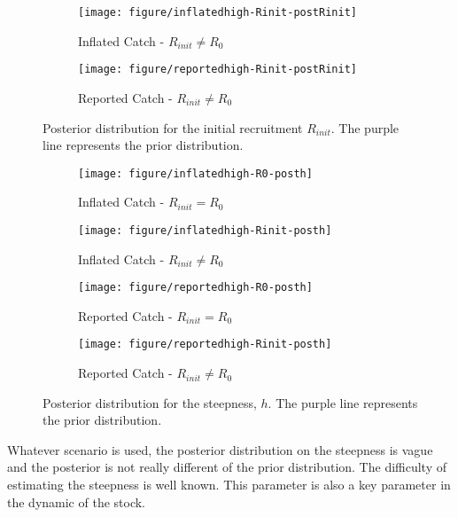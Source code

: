  \begin{figure}[htbp]
 \begin{subfigure}[b]{0.45\textwidth} 
 \texttt{[image: figure/inflatedhigh-Rinit-postRinit]}
  \caption{Inflated Catch - $R_{init}\ne R_0$}
  \end{subfigure} \hfill
 \begin{subfigure}[b]{0.45\textwidth} 
 \texttt{[image: figure/reportedhigh-Rinit-postRinit]}
  \caption{Reported Catch - $R_{init}\ne R_0$}
  \end{subfigure}
  \caption{Posterior distribution for the initial recruitment $R_{init}$. The purple line represents the prior distribution.}
  \label{fig:postRinit}
 \end{figure}
 
 
 
 
 \begin{figure}[htbp]
 \begin{subfigure}[b]{0.45\textwidth}
 \texttt{[image: figure/inflatedhigh-R0-posth]}
  \caption{Inflated Catch - $R_{init}=R_0$}
  \end{subfigure} \hfill
 \begin{subfigure}[b]{0.45\textwidth} 
 \texttt{[image: figure/inflatedhigh-Rinit-posth]}
  \caption{Inflated Catch - $R_{init}\ne R_0$}
  \end{subfigure}
 \begin{subfigure}[b]{0.45\textwidth}
 \texttt{[image: figure/reportedhigh-R0-posth]}
  \caption{Reported Catch - $R_{init}=R_0$}
  \end{subfigure} \hfill
 \begin{subfigure}[b]{0.45\textwidth} 
 \texttt{[image: figure/reportedhigh-Rinit-posth]}
  \caption{Reported Catch - $R_{init}\ne R_0$}
  \end{subfigure}
  \caption{Posterior distribution for the steepness, $h$. The purple line represents the prior distribution.}
  \label{fig:posth}
 \end{figure}
 

Whatever scenario is used, the posterior distribution on the steepness is vague and the posterior is not really different of the prior distribution. The difficulty of estimating the steepness is well known. This parameter is also a key parameter in the dynamic of the stock.

